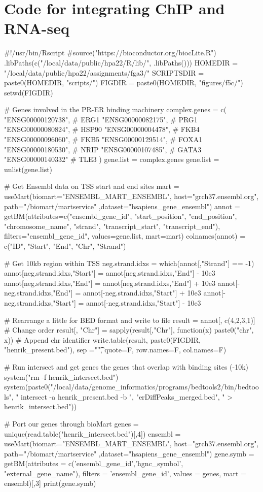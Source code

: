 \documentclass[10pt, twocolumn]{article}\usepackage[]{graphicx}\usepackage[]{color}
\theoremstyle{plain}
\begin{document}
\section*{Code for integrating ChIP and RNA-seq}
\begin{Schunk}
\begin{Sinput}
#!/usr/bin/Rscript  
#source("https://bioconductor.org/biocLite.R")
.libPaths(c("/local/data/public/hpa22/R/lib/", .libPaths()))
HOMEDIR    = "/local/data/public/hpa22/assignments/fga3/"
SCRIPTSDIR = paste0(HOMEDIR, "scripts/")
FIGDIR     = paste0(HOMEDIR, "figures/f5c/")
setwd(FIGDIR)

# Genes involved in the PR-ER binding machinery
complex.genes = c(
  "ENSG00000120738", # ERG1
  "ENSG00000082175", # PRG1 
  "ENSG00000080824", # HSP90
  "ENSG00000004478", # FKB4
  "ENSG00000096060", # FKB5
  "ENSG00000129514", # FOXA1
  "ENSG00000180530", # NRIP
  "ENSG00000107485", # GATA3
  "ENSG00000140332"  # TLE3
)
gene.list = complex.genes
gene.list = unlist(gene.list)

# Get Ensembl data on TSS start and end sites
mart  = useMart(biomart="ENSEMBL_MART_ENSEMBL", host="grch37.ensembl.org", path="/biomart/martservice" ,dataset="hsapiens_gene_ensembl")
annot = getBM(attributes=c("ensembl_gene_id", "start_position", "end_position", "chromosome_name", "strand", "transcript_start", "transcript_end"),
              filters="ensembl_gene_id", values=gene.list, mart=mart)
colnames(annot) = c("ID", "Start", "End", "Chr", "Strand")

# Get 10kb region within TSS
neg.strand.idxs = which(annot[,"Strand"] == -1)
annot[neg.strand.idxs,"Start"]  = annot[neg.strand.idxs,"End"]    - 10e3
annot[neg.strand.idxs,"End"]    = annot[neg.strand.idxs,"End"]    + 10e3
annot[-neg.strand.idxs,"End"]   = annot[-neg.strand.idxs,"Start"] + 10e3
annot[-neg.strand.idxs,"Start"] = annot[-neg.strand.idxs,"Start"] - 10e3

# Rearrange a little for BED format and write to file
result = annot[, c(4,2,3,1)] # Change order
result[, "Chr"] = sapply(result[,"Chr"], function(x) paste0("chr", x)) # Append chr identifier
write.table(result, paste0(FIGDIR, "henrik_present.bed"), sep ="\t", quote=F, row.names=F, col.names=F)

# Run intersect and get genes the genes that overlap with binding sites (-10k)
system("rm -f henrik_intersect.bed")
system(paste0("/local/data/genome_informatics/programs/bedtools2/bin/bedtools",
              " intersect -a henrik_present.bed -b ", "erDiffPeaks_merged.bed", " > henrik_intersect.bed"))

# Port our genes through bioMart
genes     = unique(read.table("henrik_intersect.bed")[,4])
ensembl   = useMart(biomart="ENSEMBL_MART_ENSEMBL", host="grch37.ensembl.org", path="/biomart/martservice" ,dataset="hsapiens_gene_ensembl")
gene.symb = getBM(attributes = c('ensembl_gene_id','hgnc_symbol', "external_gene_name"), filters = 'ensembl_gene_id', values = genes, mart = ensembl)[,3]
print(gene.symb)
\end{Sinput}
\end{Schunk}
\end{document}
